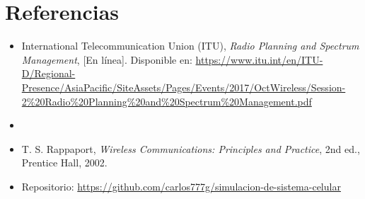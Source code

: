 \section{\Large Referencias}
\begin{itemize}
    \item International Telecommunication Union (ITU), \textit{Radio Planning and Spectrum Management}, [En línea]. Disponible en: \url{https://www.itu.int/en/ITU-D/Regional-Presence/AsiaPacific/SiteAssets/Pages/Events/2017/OctWireless/Session-2%20Radio%20Planning%20and%20Spectrum%20Management.pdf}
    \item 
    \item T. S. Rappaport, \textit{Wireless Communications: Principles and Practice}, 2nd ed., Prentice Hall, 2002.
    \item Repositorio: \url{https://github.com/carlos777g/simulacion-de-sistema-celular}
\end{itemize}